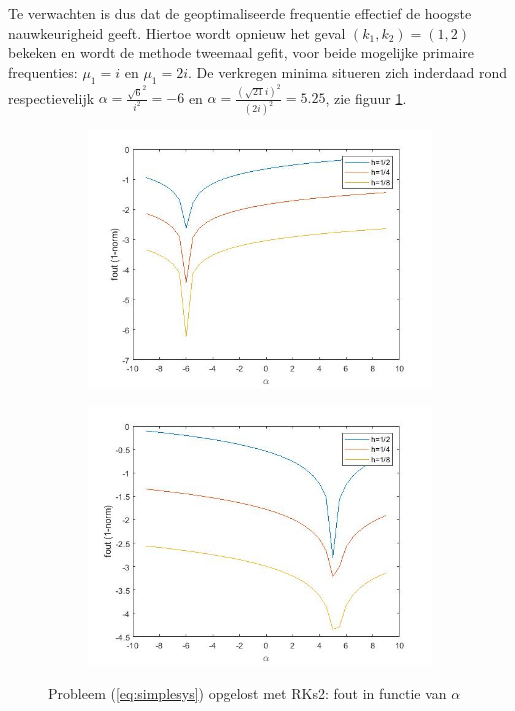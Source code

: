 \documentclass[12pt]{article}
\begin{document}
Te verwachten is dus dat de geoptimaliseerde frequentie effectief de hoogste nauwkeurigheid geeft. Hiertoe wordt opnieuw het geval \((k_1,k_2)=(1,2)\) bekeken en wordt de methode tweemaal gefit, voor beide mogelijke primaire frequenties: \(\mu_1=i\) en \(\mu_1=2i\). De verkregen minima situeren zich inderdaad rond respectievelijk \(\alpha=\frac{\sqrt{6}^2}{i^2}=-6\) en \(\alpha=\frac{(\sqrt{21}i)^2}{(2i)^2}=5.25\), zie figuur \ref{fig:simplealphasrks2}.
\begin{figure}[H]
    \centering
    \begin{subfigure}{0.49\textwidth}
        \includegraphics[width=\textwidth]{simple_i_RKs2.jpg}
    \end{subfigure}
    \begin{subfigure}{0.49\textwidth}
        \includegraphics[width=\textwidth]{simple_2i_RKs2.jpg}
    \end{subfigure}
    \caption{Probleem (\ref{eq:simplesys}) opgelost met RKs2: fout in functie van \(\alpha\)}
    \label{fig:simplealphasrks2}
\end{figure}
\end{document}
